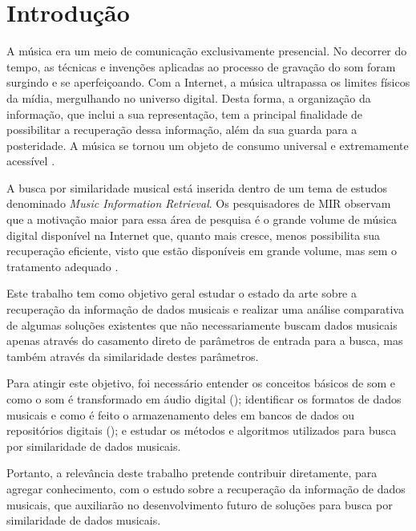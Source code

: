 \section{Introdução} \label{cap:introducao}

A música era um meio de comunicação exclusivamente presencial. No decorrer do tempo, as técnicas e invenções aplicadas ao processo de gravação do som foram surgindo e se aperfeiçoando. Com a Internet, a música ultrapassa os limites físicos da mídia, mergulhando no universo digital. Desta forma, a organização da informação, que inclui a sua representação, tem a principal finalidade de possibilitar a recuperação dessa informação, além da sua guarda para a posteridade. A música se tornou um objeto de consumo universal e extremamente acessível \cite{daquino2012, gomes2015}.

A busca por similaridade musical está inserida dentro de um tema de estudos denominado \textit{Music Information Retrieval}. Os pesquisadores de MIR observam que a motivação maior para essa área de pesquisa é o grande volume de música digital disponível na Internet que, quanto mais cresce, menos possibilita sua recuperação eficiente, visto que estão disponíveis em grande volume, mas sem o tratamento adequado \cite{mclane1996, downie2003, santinisouza2007}.

Este trabalho tem como objetivo geral estudar o estado da arte sobre a recuperação da informação de dados musicais e realizar uma análise comparativa de algumas soluções existentes que não necessariamente buscam dados musicais apenas através do casamento direto de parâmetros de entrada para a busca, mas também através da similaridade destes parâmetros.

Para atingir este objetivo, foi necessário entender os conceitos básicos de som e como o som é transformado em áudio digital (\cite{muller2007, paulozuben2004, pachecolopes2014}); identificar os formatos de dados musicais e como é feito o armazenamento deles em bancos de dados ou repositórios digitais (\cite{rafael2013, michels1992}); e estudar os métodos e algoritmos utilizados para busca por similaridade de dados musicais.

Portanto, a relevância deste trabalho pretende contribuir diretamente, para agregar conhecimento, com o estudo sobre a recuperação da informação de dados musicais, que auxiliarão no desenvolvimento futuro de soluções para busca por similaridade de dados musicais.

